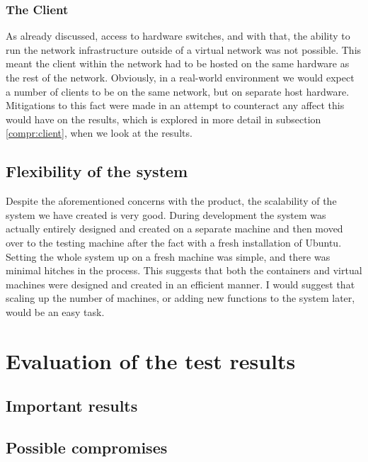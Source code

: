 \subsection{The Client}
\label{ClientHardwareLimitation}
As already discussed, access to hardware switches, and with that, the ability to run the network infrastructure outside of a virtual network was not possible. This meant the client within the network had to be hosted on the same hardware as the rest of the network. Obviously, in a real-world environment we would expect a number of clients to be on the same network, but on separate host hardware. Mitigations to this fact were made in an attempt to counteract any affect this would have on the results, which is explored in more detail in subsection \ref{compr:client}, when we look at the results.

\section{Flexibility of the system}

Despite the aforementioned concerns with the product, the scalability of the system we have created is very good. During development the system was actually entirely designed and created on a separate machine and then moved over to the testing machine after the fact with a fresh installation of Ubuntu. Setting the whole system up on a fresh machine was simple, and there was minimal hitches in the process. This suggests that both the containers and virtual machines were designed and created in an efficient manner. I would suggest that scaling up the number of machines, or adding new functions to the system later, would be an easy task.

\chapter{Evaluation of the test results}

\section{Important results}%

\section{Possible compromises}

